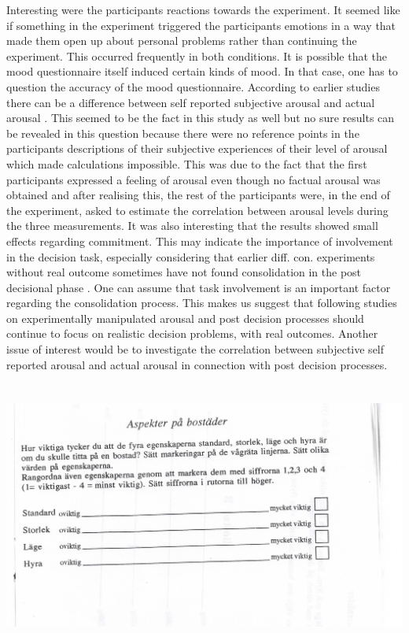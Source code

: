 Interesting were the participants reactions towards the experiment.
It seemed like if something in the experiment triggered the
participants emotions in a way that made them open up about personal
problems rather than continuing the experiment. This occurred
frequently in both conditions.  It is possible that the mood
questionnaire itself  induced certain kinds of mood. In that case, one
has to question the accuracy of the mood questionnaire.  According to
earlier studies there can be a difference between self reported
subjective arousal and actual arousal \parencite{SchedlowskiTewes92}.
This seemed to be the fact in this study as well but no sure results
can be revealed in this question because there were no reference
points in the participants descriptions of their subjective
experiences of their level of arousal which made calculations
impossible. This was due to the fact that the first participants
expressed a feeling of arousal even though no factual arousal was
obtained and after realising this, the rest of the participants were,
in the end of the experiment, asked to estimate the correlation
between arousal levels during the three measurements. It was also
interesting that the results showed small effects regarding
commitment. This may indicate the importance of involvement in the
decision task, especially considering that earlier
diff. con. experiments without real outcome sometimes have not found
consolidation in the post decisional phase
\parencite{svensson92a}. One can assume that task involvement is an
important factor regarding the consolidation process. This makes us
suggest that following studies on experimentally manipulated arousal
and post decision processes should continue to focus on realistic
decision problems, with real outcomes.  Another issue of interest
would be to investigate the  correlation between subjective self
reported arousal and actual arousal in connection with post decision
processes.








\printbibliography[heading=bib]



\onecolumn
\pagestyle{plain}


\appendix

\section{}\label{app:a}\includegraphics{Appendencies/AppendixA}\clearpage

